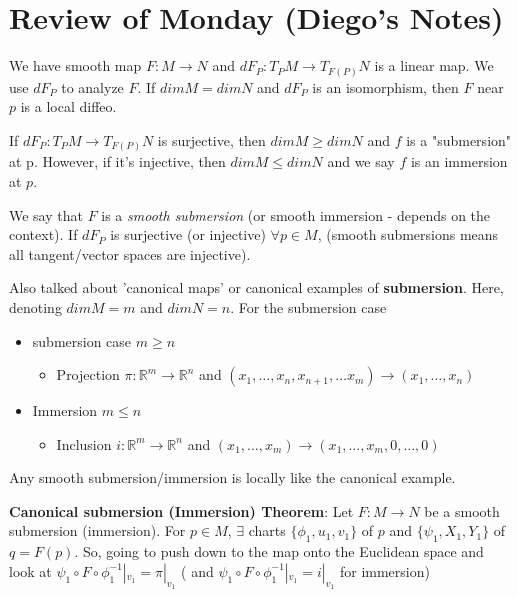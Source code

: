 \documentclass[12pt,letterpaper]{article}
\begin{document}
\section{Review of Monday (Diego's Notes)}

We have smooth map $F: M \rightarrow N$ and $dF_P : T_PM \rightarrow T_{F(P)} N$ is a linear map. We use $dF_P $ to analyze $F$. If $dimM = dimN$ and $dF_P$ is an isomorphism, then $F$ near $p$ is a local diffeo.

If $dF_P: T_P M \rightarrow T_{F(P)} N$ is surjective, then $dimM \geq dimN$ and $f$ is a "submersion"  at p. However, if it's injective, then $dimM \leq dimN$ and we say $f$ is an immersion at $p$. 

We say that $F$ is a \textit{smooth submersion} (or smooth immersion - depends on the context). If $dF_P$ is surjective (or injective) $\forall p \in M$, (smooth submersions means all tangent/vector spaces are injective).

Also talked about 'canonical maps' or canonical examples of \textbf{submersion}. Here, denoting $dimM = m$ and $dimN = n$. For the submersion case

\begin{itemize}
    \item submersion case $m \geq n$
    \begin{itemize}
        \item Projection $\pi: \mathbb{R}^m \rightarrow \mathbb{R}^n$ and $(x_1, \dots, x_n, x_{n+1}, \dots x_m) \rightarrow (x_1, \dots, x_n)$
    \end{itemize}
    \item Immersion $m \leq n$
    \begin{itemize}
        \item Inclusion $i: \mathbb{R}^m \rightarrow \mathbb{R}^n$ and $(x_1, \dots, x_m) \rightarrow (x_1, \dots, x_m, 0, \dots, 0)$
    \end{itemize}
\end{itemize}

Any smooth submersion/immersion is locally like the canonical example.

\textbf{Canonical submersion (Immersion) Theorem}: Let $F: M \rightarrow N$ be a smooth submersion (immersion). For $p \in M$, $\exists$ charts $\{ \phi_1, u_1, v_1\}$ of $p$ and $\{ \psi_1, X_1, Y_1\}$ of $q = F(p)$. So, going to push down to the map onto the Euclidean space and look at $\psi_1 \circ F \circ \phi_1^{-1}|_{v_1} = \pi|_{v_1}$ ( and $\psi_1 \circ F \circ \phi_1^{-1}|_{v_1} = i|_{v_1}$ for immersion)
\end{document}
